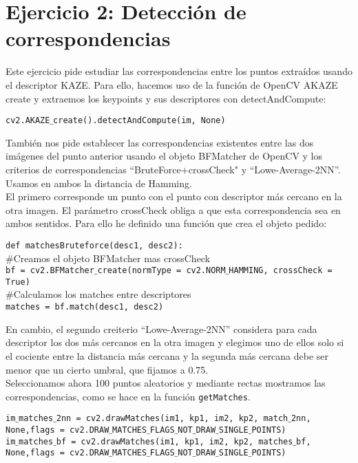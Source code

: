 \documentclass[12pt]{article}
\begin{document}
\section*{Ejercicio 2: Detección de correspondencias}
Este ejercicio pide estudiar las correspondencias entre los puntos extraídos usando el descriptor KAZE. Para ello, hacemos uso de la función de OpenCV AKAZE create y extraemos los keypoints y sus descriptores con detectAndCompute:
\begin{center}
\texttt{cv2.AKAZE$\_$create().detectAndCompute(im, None)}
\end{center}
También nos pide establecer las correspondencias existentes entre las dos imágenes del punto anterior usando el objeto BFMatcher de OpenCV y los criterios de correspondencias “BruteForce+crossCheck" y “Lowe-Average-2NN”. Usamos en ambos la distancia de Hamming.\\
El primero corresponde un punto con el punto con
descriptor más cercano en la otra imagen. El parámetro crossCheck obliga a que esta correspondencia sea en ambos sentidos. Para ello he definido una función que crea el objeto pedido:
\begin{center}
\texttt{def matchesBruteforce(desc1, desc2):}\\
$\#$Creamos el objeto BFMatcher mas crossCheck\\
\texttt{bf = cv2.BFMatcher$\_$create(normType = cv2.NORM$\_$HAMMING, crossCheck = True)}\\
$\#$Calculamos los matches entre descriptores\\
\texttt{matches = bf.match(desc1, desc2)}
\end{center}
En cambio, el segundo creiterio “Lowe-Average-2NN” considera para cada descriptor los dos más cercanos en la otra imagen y elegimos uno de ellos solo si el cociente entre la distancia más cercana y la segunda más cercana debe ser menor que un cierto umbral, que fijamos a 0.75.\\
Seleccionamos ahora 100 puntos aleatorios y mediante rectas mostramos las correspondencias, como se hace en la función \texttt{getMatches}.
\begin{center}
\texttt{im$\_$matches$\_$2nn = cv2.drawMatches(im1, kp1, im2, kp2, match$\_$2nn, None,flags = cv2.DRAW$\_$MATCHES$\_$FLAGS$\_$NOT$\_$DRAW$\_$SINGLE$\_$POINTS)}\\
\texttt{im$\_$matches$\_$bf = cv2.drawMatches(im1, kp1, im2, kp2, matches$\_$bf, None,flags = cv2.DRAW$\_$MATCHES$\_$FLAGS$\_$NOT$\_$DRAW$\_$SINGLE$\_$POINTS)}
\end{center}
\end{document}
